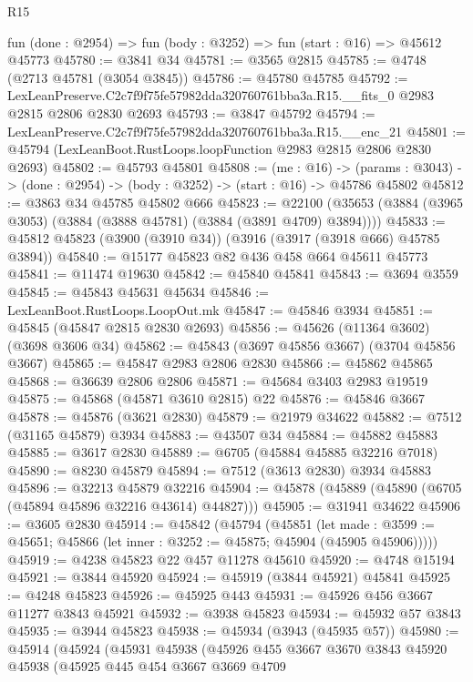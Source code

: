 \begin{lexlean}{R15}
\begin{coremodule}
  fun (done : @2954) => fun (body : @3252) => fun (start : @16) => @45612 @45773
@45780 := @3841 @34
@45781 := @3565 @2815
@45785 := @4748 (@2713 @45781 (@3054 @3845))
@45786 := @45780 @45785
@45792 := LexLeanPreserve.C2c7f9f75fe57982dda320760761bba3a.R15.__fits_0
    @2983
    @2815
    @2806
    @2830
    @2693
@45793 := @3847 @45792
@45794 := LexLeanPreserve.C2c7f9f75fe57982dda320760761bba3a.R15.__enc_21
@45801 := @45794 (LexLeanBoot.RustLoops.loopFunction @2983 @2815 @2806 @2830 @2693)
@45802 := @45793 @45801
@45808 := (me : @16) ->
  (params : @3043) -> (done : @2954) -> (body : @3252) -> (start : @16) -> @45786 @45802
@45812 := @3863 @34 @45785 @45802 @666
@45823 := @22100 (@35653 (@3884 (@3965 @3053) (@3884 (@3888 @45781) (@3884 (@3891 @4709) @3894))))
@45833 := @45812 @45823 (@3900 (@3910 @34)) (@3916 (@3917 (@3918 @666) @45785 @3894))
@45840 := @15177 @45823 @82 @436 @458 @664 @45611 @45773
@45841 := @11474 @19630
@45842 := @45840 @45841
@45843 := @3694 @3559
@45845 := @45843 @45631 @45634
@45846 := LexLeanBoot.RustLoops.LoopOut.mk
@45847 := @45846 @3934
@45851 := @45845 (@45847 @2815 @2830 @2693)
@45856 := @45626 (@11364 @3602) (@3698 @3606 @34)
@45862 := @45843 (@3697 @45856 @3667) (@3704 @45856 @3667)
@45865 := @45847 @2983 @2806 @2830
@45866 := @45862 @45865
@45868 := @36639 @2806 @2806
@45871 := @45684 @3403 @2983 @19519
@45875 := @45868 (@45871 @3610 @2815) @22
@45876 := @45846 @3667
@45878 := @45876 (@3621 @2830)
@45879 := @21979 @34622
@45882 := @7512 (@31165 @45879) @3934
@45883 := @43507 @34
@45884 := @45882 @45883
@45885 := @3617 @2830
@45889 := @6705 (@45884 @45885 @32216 @7018)
@45890 := @8230 @45879
@45894 := @7512 (@3613 @2830) @3934 @45883
@45896 := @32213 @45879 @32216
@45904 := @45878 (@45889 (@45890 (@6705 (@45894 @45896 @32216 @43614) @44827)))
@45905 := @31941 @34622
@45906 := @3605 @2830
@45914 := @45842
    (@45794
      (@45851
        (let made : @3599 := @45651; @45866 (let inner : @3252 := @45875; @45904 (@45905 @45906)))))
@45919 := @4238 @45823 @22 @457 @11278 @45610
@45920 := @4748 @15194
@45921 := @3844 @45920
@45924 := @45919 (@3844 @45921) @45841
@45925 := @4248 @45823
@45926 := @45925 @443
@45931 := @45926 @456 @3667 @11277 @3843 @45921
@45932 := @3938 @45823
@45934 := @45932 @57 @3843
@45935 := @3944 @45823
@45938 := @45934 (@3943 (@45935 @57))
@45980 := @45914
    (@45924
      (@45931
        @45938
        (@45926
          @455
          @3667
          @3670
          @3843
          @45920
          @45938
          (@45925
            @445
            @454
            @3667
            @3669
            @4709

\end{coremodule}
\end{lexlean}
